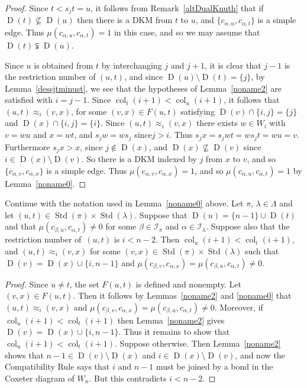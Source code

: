 \documentclass[ALCO,ThmDefs,Unicode,epreuves]{cedram}
\DeclareMathOperator{\col}{col}
\DeclareMathOperator{\STD}{Std}
\DeclareMathOperator{\D}{D}
\begin{document}
\begin{proof}
Since $t<s_jt=u$, it follows from Remark~\ref{altDualKnuth} that if $\D(t)\nsubseteq\D(u)$
then there is a DKM
from $t$ to $u$, and $\{c_{\alpha,u},c_{\alpha,t}\}$
is a simple edge. Thus $\mu(c_{\alpha,u},c_{\alpha,t}) = 1$ in this case, and so we may
assume that $\D(t)\subsetneqq\D(u)$.

Since $u$ is obtained from $t$ by interchanging $j$ and $j+1$, it is clear
that $j-1$ is the restriction number of $(u,t)$, and since $\D(u)\setminus\D(t)=\{j\}$,
by Lemma~\ref{dessjtminust}, we see that the hypotheses of Lemma~\ref{noname2} are
satisfied with $i=j-1$. Since $\col_t(i+1)<\col_u(i+1)$, it
follows that $(u,t)\approx_i(v,x)$, for some $(v,x)\in F(u,t)$ satisfying
$\D(v)\cap\{i,j\}=\{j\}$ and $\D(x)\cap\{i,j\}=\{i\}$. Since
$(u,t)\approx_i(v,x)$ there exists $w\in W_i$ with $v=wu$ and $x=wt$, and
$s_jw=ws_j$ since$j>i$. Thus $s_jx=s_jwt=ws_jt=wu=v$. Furthermore $s_jx>x$, since
$j\notin\D(x)$, and $\D(x)\nsubseteq\D(v)$ since $i\in\D(x)\setminus\D(v)$.
So there is a DKM
indexed by $j$ from $x$ to $v$, and so
$\{c_{\alpha,v},c_{\alpha,x}\}$ is a simple edge. Thus
$\mu(c_{\alpha,v},c_{\alpha,x})=1$, and so $\mu(c_{\alpha,u},c_{\alpha,t})=1$ by
Lemma~\ref{noname0}.
\end{proof}

\begin{lemm}\label{noname1muequallambda}
Continue with the notation used in Lemma~\ref{noname0} above. Let
$\pi,\,\lambda\in\Lambda$ and let $(u,t)\in\STD(\pi)\times\STD(\lambda)$.
Suppose that $\D(u) = \{n-1\} \cup \D(t)$ and that $\mu(c_{\beta,u},c_{\alpha,t}) \neq 0$
for some $\beta\in\mathcal{I}_{\pi}$ and $\alpha\in\mathcal{I}_{\lambda}$.
Suppose also that the restriction number of~$(u,t)$
is $i< n-2$. Then $\col_u(i+1)<\col_t(i+1)$, and $(u,t)\approx_i (v,x)$ for some
$(v,x)\in\STD(\pi)\times\STD(\lambda)$ such that
$\D(v)=\D(x)\cup\{i,n-1\}$ and $\mu(c_{\beta,v},c_{\alpha,x})=\mu(c_{\beta,u},c_{\alpha,t}) \neq 0$.
\end{lemm}

\begin{proof}
Since $u\ne t$, the set $F(u,t)$ is defined and nonempty.
Let $(v,x)\in F(u,t)$. Then it follows by Lemmas~\ref{noname2} and
\ref{noname0} that $(u,t)\approx_i (v,x)$
and $\mu(c_{\beta,v},c_{\alpha,x})=\mu(c_{\beta,u},c_{\alpha,t}) \neq 0$.
Moreover, if $\col_u(i+1)<\col_t(i+1)$ then
Lemma~\ref{noname2} gives $\D(v)=\D(x)\cup\{i,n-1\}$. Thus it
remains to show that $\col_u(i+1)<\col_t(i+1)$. Suppose otherwise.
Then Lemma~\ref{noname2} shows that $n-1\in\D(v)\setminus\D(x)$
and $i\in\D(x)\setminus\D(v)$, and now the
Compatibility Rule
says that
$i$ and $n-1$ must be joined by a bond in the Coxeter diagram of $W_n$.
But this contradicts $i<n-2$.
\end{proof}
\end{document}
